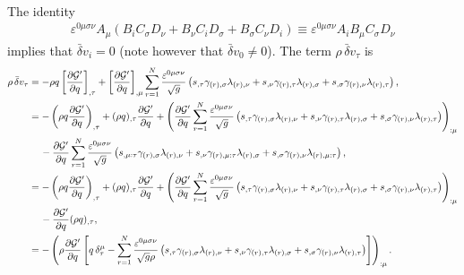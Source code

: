 \documentclass{article}
\numberwithin{equation}{section}
\begin{document}
\begin{appendices}
\begin{enumerate}[leftmargin=*]
\begin{align}
\end{align}
The identity
\begin{align}
\varepsilon^{0\mu\sigma\nu} A_\mu \left( B_i C_\sigma D_\nu + B_\nu C_i D_\sigma + B_\sigma C_\nu D_i \right) \equiv \varepsilon^{0\mu\sigma\nu} A_i B_\mu C_\sigma D_\nu
\end{align}
implies that $\bar\delta v_i=0$ (note however that $\bar\delta v_0 \ne 0$). The term $\rho\,\bar\delta v_\tau$ is
\begin{align}
\rho\,\bar\delta v_\tau &= -\rho q\left[ \frac{\partial{\cal G}'}{\partial q} \right]_{,\tau}+\left[\frac{\partial{\cal G}'}{\partial q}\right]_{,\mu} \sum_{r=1}^N \frac{\varepsilon^{0\mu\sigma\nu}}{\sqrt{g}} \left( s_{,\tau}\gamma_{(r),\sigma} \lambda_{(r),\nu} + s_{,\nu} \gamma_{(r),\tau}\lambda_{(r),\sigma} + s_{,\sigma}\gamma_{(r),\nu} \lambda_{(r),\tau} \right), \nonumber \\
&= -\left( \rho q \frac{\partial{\cal G}'}{\partial q} \right)_{,\tau} + (\rho q)_{,\tau} \frac{\partial{\cal G}'}{\partial q} + \left(\frac{\partial{\cal G}'}{\partial q} \sum_{r=1}^N \frac{\varepsilon^{0\mu\sigma\nu}}{\sqrt{g}} \left( s_{,\tau}\gamma_{(r),\sigma} \lambda_{(r),\nu} + s_{,\nu} \gamma_{(r),\tau}\lambda_{(r),\sigma} + s_{,\sigma}\gamma_{(r),\nu} \lambda_{(r),\tau} \right) \right)_{:\mu} \nonumber \\
&\quad\, -\frac{\partial{\cal G}'}{\partial q} \sum_{r=1}^N \frac{\varepsilon^{0\mu\sigma\nu}}{\sqrt{g}} \left( s_{,\mu:\tau}\gamma_{(r),\sigma} \lambda_{(r),\nu} + s_{,\nu} \gamma_{(r),\mu:\tau}\lambda_{(r),\sigma} + s_{,\sigma}\gamma_{(r),\nu} \lambda_{(r),\mu:\tau} \right), \nonumber \\
&= -\left( \rho q \frac{\partial{\cal G}'}{\partial q} \right)_{,\tau} + (\rho q)_{,\tau} \frac{\partial{\cal G}'}{\partial q} + \left(\frac{\partial{\cal G}'}{\partial q} \sum_{r=1}^N \frac{\varepsilon^{0\mu\sigma\nu}}{\sqrt{g}} \left( s_{,\tau}\gamma_{(r),\sigma} \lambda_{(r),\nu} + s_{,\nu} \gamma_{(r),\tau}\lambda_{(r),\sigma} + s_{,\sigma}\gamma_{(r),\nu} \lambda_{(r),\tau} \right) \right)_{:\mu} \nonumber \\
&\quad\, -\frac{\partial{\cal G}'}{\partial q} (\rho q)_{,\tau}, \nonumber \\
&= -\left(\rho\frac{\partial{\cal G}'}{\partial q} \left[q\,\delta^\mu_\tau-\sum_{r=1}^N \frac{\varepsilon^{0\mu\sigma\nu}}{\sqrt{g}\rho} \left( s_{,\tau}\gamma_{(r),\sigma} \lambda_{(r),\nu} + s_{,\nu} \gamma_{(r),\tau}\lambda_{(r),\sigma} + s_{,\sigma}\gamma_{(r),\nu} \lambda_{(r),\tau} \right) \right]\right)_{:\mu}.

\end{align}
\end{enumerate}
\end{appendices}
\end{document}
